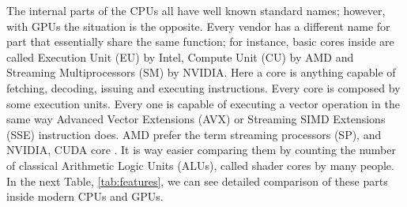 \documentclass{article}
\begin{document}
The internal parts of the CPUs all have well known standard names;
however, with GPUs the situation is the opposite. Every vendor has a
different name for part that essentially share the same function; for
instance, basic cores %
inside are called Execution Unit (EU) by Intel, Compute Unit (CU) by
AMD and Streaming Multiprocessors (SM) by NVIDIA. Here a core is
anything capable of fetching, decoding, issuing and executing
instructions. Every core is composed by some execution units. Every one
is capable of executing a vector operation in the same way Advanced Vector Extensions (AVX) or Streaming SIMD Extensions (SSE) instruction does. AMD prefer the term streaming processors (SP), and NVIDIA, CUDA core \cite{YangCUDA15}. It is way easier comparing them by counting the number of classical Arithmetic Logic Units (ALUs), called shader cores by many people. In the next Table, \ref{tab:features}, we can see detailed comparison of these parts inside modern CPUs and GPUs.
\end{document}

